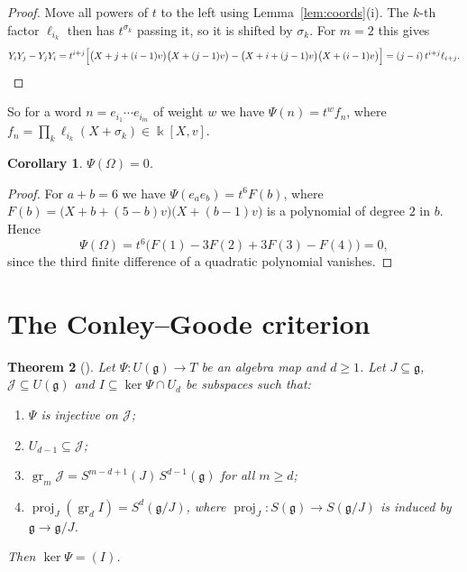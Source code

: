 \documentclass[11pt]{amsart}
\newtheorem{theorem}{Theorem}[section]
\newtheorem{corollary}[theorem]{Corollary}
\theoremstyle{definition}
\theoremstyle{remark}
\newcommand{\g}{\mathfrak{g}}
\newcommand{\U}{U}
\newcommand{\cJ}{\mathcal{J}}
\newcommand{\gr}{\operatorname{gr}}
\newcommand{\proj}{\operatorname{proj}}
\newcommand{\kk}{\Bbbk}
\begin{document}
\begin{proof}
Move all powers of $t$ to the left using Lemma~\ref{lem:coords}(i). The $k$-th factor $\ell_{i_k}$ then has $t^{\sigma_k}$ passing it, so it is shifted by $\sigma_k$. For $m=2$ this gives
\[
Y_iY_j-Y_jY_i=t^{i+j}\Bigl[\bigl(X+j+(i-1)v\bigr)\bigl(X+(j-1)v\bigr)-\bigl(X+i+(j-1)v\bigr)\bigl(X+(i-1)v\bigr)\Bigr]=(j-i)\,t^{i+j}\ell_{i+j}.\qedhere
\]
\end{proof}

So for a word $n=e_{i_1}\cdots e_{i_m}$ of weight $w$ we have $\Psi(n)=t^wf_n$, where $f_n=\prod_k\ell_{i_k}(X+\sigma_k)\in\kk[X,v]$.

\begin{corollary}\label{cor:Omega}
$\Psi(\Omega)=0$.
\end{corollary}

\begin{proof}
For $a+b=6$ we have $\Psi(e_ae_b)=t^6F(b)$, where $F(b)=\bigl(X+b+(5-b)v\bigr)\bigl(X+(b-1)v\bigr)$ is a polynomial of degree $2$ in $b$. Hence
\[
\Psi(\Omega)=t^6\bigl(F(1)-3F(2)+3F(3)-F(4)\bigr)=0,
\]
since the third finite difference of a quadratic polynomial vanishes.
\end{proof}

\section{The Conley--Goode criterion}

\begin{theorem}[{\cite[Prop.~3.1]{CG}}]\label{thm:CG}
Let $\Psi:\U(\g)\to T$ be an algebra map and $d\ge1$. Let $J\subseteq\g$, $\cJ\subseteq\U(\g)$ and $I\subseteq\ker\Psi\cap\U_d$ be subspaces such that:
\begin{enumerate}[label=\textup{(\alph*)}]
\item $\Psi$ is injective on $\cJ$;
\item $\U_{d-1}\subseteq\cJ$;
\item $\gr_m\cJ=S^{m-d+1}(J)\,S^{d-1}(\g)$ for all $m\ge d$;
\item $\proj_J(\gr_dI)=S^d(\g/J)$, where $\proj_J:S(\g)\to S(\g/J)$ is induced by $\g\to\g/J$.
\end{enumerate}
Then $\ker\Psi=(I)$.
\end{theorem}
\end{document}
